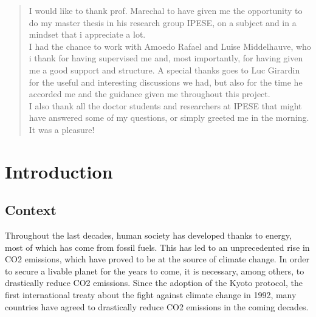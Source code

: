 \documentclass{article}
\begin{document}
\newpage
\renewcommand{\abstractname }{Acknowledgments}
\begin{abstract}
	I would like to thank prof. Marechal to have given me the opportunity to do my master thesis in his research group IPESE, on a subject and in a mindset that i appreciate a lot.\\ 
	
	I had the chance to work with Amoedo Rafael and Luise Middelhauve, who i thank for having supervised me and, most importantly, for having given me a good support and structure. A special thanks goes to Luc Girardin for the useful and interesting discussions we had, but also for the time he accorded me and the guidance given me throughout this project. \\
	
	I also thank all the doctor students and researchers at IPESE that might have answered some of my questions, or simply greeted me in the morning. It was a pleasure!
\end{abstract}
\thispagestyle{empty}

\newpage
\null
\thispagestyle{empty} %
\clearpage

\newpage
\tableofcontents
\thispagestyle{empty} 




\setcounter{page}{1}
\renewcommand{\thepage}{\arabic{page}}
\newpage


\section{Introduction}

\subsection{Context}
Throughout the last decades, human society has developed thanks to energy, most of which has come from fossil fuels. This has led to an unprecedented rise in CO2 emissions, which have proved to be at the source of climate change. In order to secure a livable planet for the years to come, it is necessary, among others, to drastically reduce CO2 emissions\cite{ipccSummaryPolicymakersIPCC2018}. Since the adoption of the Kyoto protocol, the first international treaty about the fight against climate change in 1992, many countries have agreed to drastically reduce CO2 emissions in the coming decades.\\
\end{document}
